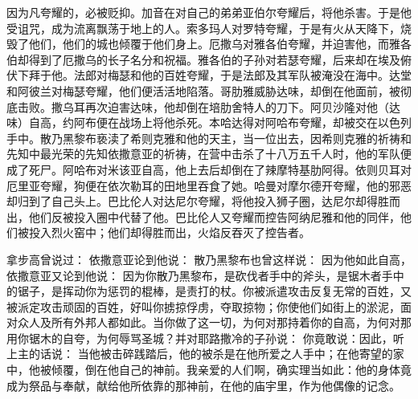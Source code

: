  因为凡夸耀的，必被贬抑。加音在对自己的弟弟亚伯尔夸耀后，将他杀害。于是他受诅咒，成为流离飘荡于地上的人。索多玛人对罗特夸耀，于是有火从天降下，烧毁了他们，他们的城也倾覆于他们身上。厄撒乌对雅各伯夸耀，并迫害他，而雅各伯却得到了厄撒乌的长子名分和祝福。雅各伯的子孙对若瑟夸耀，后来却在埃及俯伏下拜于他。法郎对梅瑟和他的百姓夸耀，于是法郎及其军队被淹没在海中。达堂和阿彼兰对梅瑟夸耀，他们便活活地陷落。哥肋雅威胁达味，却倒在他面前，被彻底击败。撒乌耳再次迫害达味，他却倒在培肋舍特人的刀下。阿贝沙隆对他（达味）自高，约阿布便在战场上将他杀死。本哈达得对阿哈布夸耀，却被交在以色列手中。散乃黑黎布亵渎了希则克雅和他的天主，当一位出去，因希则克雅的祈祷和先知中最光荣的先知依撒意亚的祈祷，在营中击杀了十八万五千人时，他的军队便成了死尸。阿哈布对米该亚自高，他上去后却倒在了辣摩特基肋阿得。依则贝耳对厄里亚夸耀，狗便在依次勒耳的田地里吞食了她。哈曼对摩尔德开夸耀，他的邪恶却归到了自己头上。巴比伦人对达尼尔夸耀，将他投入狮子圈，达尼尔却得胜而出，他们反被投入圈中代替了他。巴比伦人又夸耀而控告阿纳尼雅和他的同伴，他们被投入烈火窑中；他们却得胜而出，火焰反吞灭了控告者。\par

 拿步高曾说过： 依撒意亚论到他说： 散乃黑黎布也曾这样说： 因为他如此自高，依撒意亚又论到他说： 因为你散乃黑黎布，是砍伐者手中的斧头，是锯木者手中的锯子，是挥动你为惩罚的棍棒，是责打的杖。你被派遣攻击反复无常的百姓，又被派定攻击顽固的百姓，好叫你掳掠俘虏，夺取掠物；你使他们如街上的淤泥，面对众人及所有外邦人都如此。当你做了这一切，为何对那持着你的自高，为何对那用你锯木的自夸，为何辱骂圣城？并对耶路撒冷的子孙说： 你竟敢说：因此，听上主的话说： 当他被击碎践踏后，他的被杀是在他所爱之人手中；在他寄望的家中，他被倾覆，倒在他自己的神前。我亲爱的人们啊，确实理当如此：他的身体竟成为祭品与奉献，献给他所依靠的那神前，在他的庙宇里，作为他偶像的记念。\par

